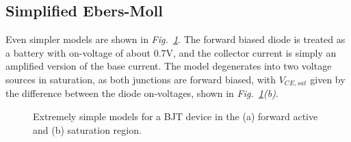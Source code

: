 \subsection{Simplified Ebers-Moll}
Even simpler models are shown in \emph{Fig.~\ref{fig:slide19}}. The forward biased diode is treated as a battery with on-voltage of about 0.7V, and the collector current is simply an amplified version of the base current.  The model degenerates into two voltage sources in saturation, as both junctions are forward biased, with $V_{CE,sat}$ given by the difference between the diode on-voltages, shown in \emph{Fig.~\ref{fig:slide19}(b)}.
\begin{figure}[tb]
\centering
{}
\caption{Extremely simple models for a BJT device in the (a) forward active and (b) saturation region.} \label{fig:slide19}
\end{figure} 
